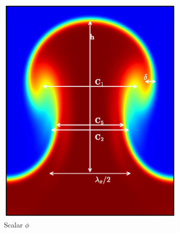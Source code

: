 \begin{figure}
\begin{subfigure}[b]{0.5\textwidth}
\includegraphics[width=\textwidth]{figs/slice}
\caption{Scalar $\phi$}
\end{subfigure}
\begin{subfigure}[b]{0.5\textwidth}

\end{subfigure}
\end{figure}
